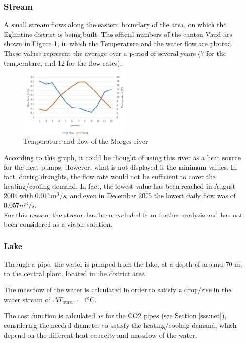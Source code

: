\documentclass{article}
\begin{document}
\subsubsection{Stream}
A small stream flows along the eastern boundary of the area, on which the Eglantine district is being built. The official numbers of the canton Vaud \cite{veillehydro-meteorologiqueducantondevaudMorgesRiviereDebit} are shown in Figure \ref{fig:river}, in which the Temperature and the water flow are plotted. These values represent the average over a period of several years (7 for the temperature, and 12 for the flow rates). 

\begin{figure}[htp]
	\centering
	\includegraphics[width=0.5\textwidth]{river.JPG}
	\caption{Temperature and flow of the Morges river}
	\label{fig:river}
\end{figure}

According to this graph, it could be thought of using this river as a heat source for the heat pumps. However, what is not displayed is the minimum values. In fact, during droughts, the flow rate would not be sufficient to cover the heating/cooling demand. In fact, the lowest value has been reached in August 2004 with $0.017 m^3/s$, and even in December 2005 the lowest daily flow was of $0.057 m^3/s$. \\
For this reason, the stream has been excluded from further analysis and has not been considered as a viable solution.

\subsubsection{Lake}
Through a pipe, the water is pumped from the lake, at a depth of around 70 m, to the central plant, located in the district area. 

The massflow of the water is calculated in order to satisfy a drop/rise in the water stream of $\Delta T_{water}  = 4 \si{\celsius}$.

The cost function is calculated as for the CO2 pipes (see Section \ref{sss:net}), considering the needed diameter to satisfy the heating/cooling demand, which depend on the different heat capacity and massflow of the water.
\end{document}
